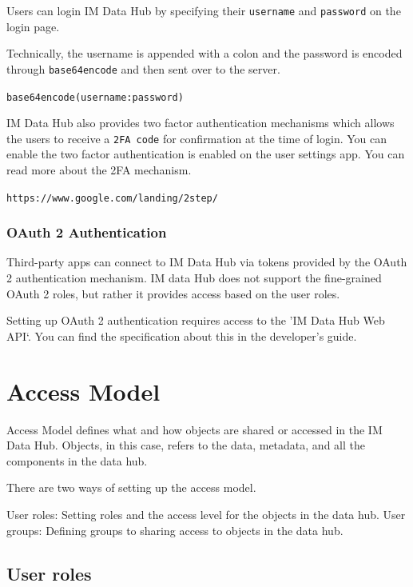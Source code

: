 \documentclass[]{book}
\begin{document}
Users can login IM Data Hub by specifying their \texttt{username} and \texttt{password} on the login page.

Technically, the username is appended with a colon and the password is encoded through \texttt{base64encode} and then sent over to the server.

\texttt{base64encode(username:password)}

IM Data Hub also provides two factor authentication mechanisms which allows the users to receive a \texttt{2FA\ code} for confirmation at the time of login. You can enable the two factor authentication is enabled on the user settings app. You can read more about the 2FA mechanism.

\texttt{https://www.google.com/landing/2step/}

\hypertarget{oauth-2-authentication}{%
\subsubsection{OAuth 2 Authentication}\label{oauth-2-authentication}}

Third-party apps can connect to IM Data Hub via tokens provided by the OAuth 2 authentication mechanism. IM data Hub does not support the fine-grained OAuth 2 roles, but rather it provides access based on the user roles.

Setting up OAuth 2 authentication requires access to the 'IM Data Hub Web API`. You can find the specification about this in the developer's guide.

\hypertarget{access-model}{%
\section{Access Model}\label{access-model}}

Access Model defines what and how objects are shared or accessed in the IM Data Hub. Objects, in this case, refers to the data, metadata, and all the components in the data hub.

There are two ways of setting up the access model.

User roles: Setting roles and the access level for the objects in the data hub.
User groups: Defining groups to sharing access to objects in the data hub.

\hypertarget{user-roles}{%
\subsection{User roles}\label{user-roles}}
\end{document}
